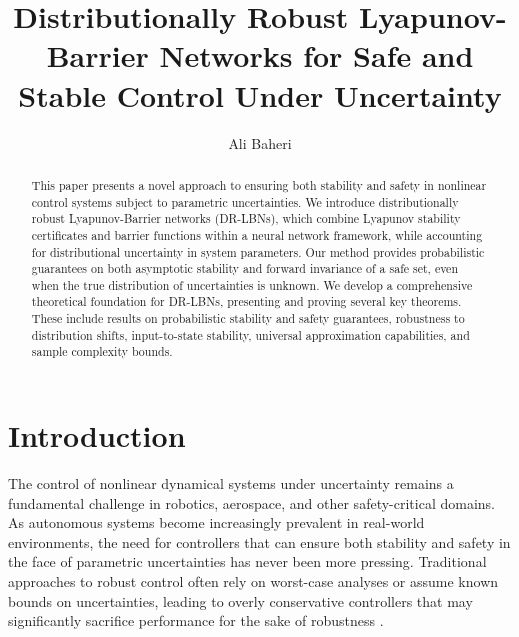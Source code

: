 \documentclass[11pt, oneside]{article}
\date{}
\title{
\vspace{-1.5cm}
\large{\bf }
\vspace{-0.5cm}
}
\title{Distributionally Robust Lyapunov-Barrier Networks for Safe and Stable Control Under Uncertainty}
\author{Ali Baheri}
\begin{document}
\maketitle

\begin{abstract}
This paper presents a novel approach to ensuring both stability and safety in nonlinear control systems subject to parametric uncertainties. We introduce distributionally robust Lyapunov-Barrier networks (DR-LBNs), which combine Lyapunov stability certificates and barrier functions within a neural network framework, while accounting for distributional uncertainty in system parameters. Our method provides probabilistic guarantees on both asymptotic stability and forward invariance of a safe set, even when the true distribution of uncertainties is unknown. We develop a comprehensive theoretical foundation for DR-LBNs, presenting and proving several key theorems. These include results on probabilistic stability and safety guarantees, robustness to distribution shifts, input-to-state stability, universal approximation capabilities, and sample complexity bounds. 
\end{abstract}

\section{Introduction}

The control of nonlinear dynamical systems under uncertainty remains a fundamental challenge in robotics, aerospace, and other safety-critical domains. As autonomous systems become increasingly prevalent in real-world environments, the need for controllers that can ensure both stability and safety in the face of parametric uncertainties has never been more pressing. Traditional approaches to robust control often rely on worst-case analyses or assume known bounds on uncertainties, leading to overly conservative controllers that may significantly sacrifice performance for the sake of robustness \cite{ho2021online}.
\end{document}
